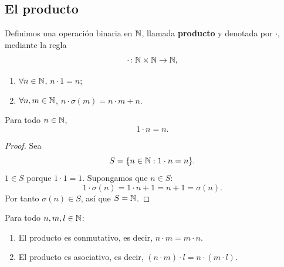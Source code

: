 \documentclass[12pt,a4paper]{book}
\begin{document}
    \subsection{El producto}

    \begin{definicion}[Producto]
        Definimos una operación binaria en $\mathbb{N}$, llamada \textbf{producto} y denotada por $\cdot$, mediante la regla
        \begin{equation*}
            \cdot \colon \mathbb{N} \times \mathbb{N} \to \mathbb{N},
        \end{equation*}
        \begin{enumerate}
            \item[(1)] $\forall n \in \mathbb{N}$, $n \cdot 1 = n$;
            \item[(2)] $\forall n,m \in \mathbb{N}$, $n \cdot \sigma(m) = n\cdot m + n$.
        \end{enumerate}
    \end{definicion}

    \begin{proposicion}
        Para todo $n \in \mathbb{N}$,
        \begin{equation*}
            1 \cdot n = n.
        \end{equation*}
    \end{proposicion}
    \begin{proof}
        Sea
        \begin{equation*}
            S = \{n \in \mathbb{N} : 1 \cdot n = n\}.
        \end{equation*}
        $1 \in S$ porque $1 \cdot 1 = 1$. Supongamos que $n \in S$:
        \begin{equation*}
            1 \cdot \sigma(n) = 1 \cdot n + 1 = n+1 = \sigma(n).
        \end{equation*}
        Por tanto $\sigma(n) \in S$, así que $S = \mathbb{N}$.
    \end{proof}

    \begin{proposicion}
        Para todo $n,m,l \in \mathbb{N}$:
        \begin{enumerate}[label=(\arabic*)]
            \item El producto es conmutativo, es decir, $n \cdot m = m \cdot n$.
            \item El producto es asociativo, es decir, $(n \cdot m) \cdot l = n \cdot (m \cdot l)$.
        \end{enumerate}
    \end{proposicion}
\end{document}
